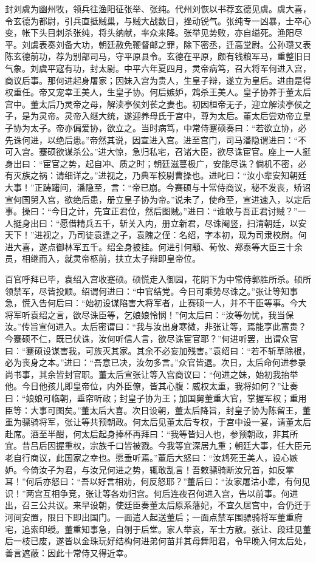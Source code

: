 封刘虞为幽州牧，领兵往渔阳征张举、张纯。代州刘恢以书荐玄德见虞。虞大喜，令玄德为都尉，引兵直抵贼巢，与贼大战数日，挫动锐气。张纯专一凶暴，士卒心变，帐下头目刺杀张纯，将头纳献，率众来降。张举见势败，亦自缢死。渔阳尽平。刘虞表奏刘备大功，朝廷赦免鞭督邮之罪，除下密丞，迁高堂尉。公孙瓒又表陈玄德前功，荐为别部司马，守平原县令。玄德在平原，颇有钱粮军马，重整旧日气象。刘虞平寇有功，封太尉。中平六年夏四月，灵帝病笃，召大将军何进入宫，商议后事。那何进起身屠家；因妹入宫为贵人，生皇子辩，遂立为皇后。进由是得权重任。帝又宠幸王美人，生皇子协。何后嫉妒，鸩杀王美人。皇子协养于董太后宫中。董太后乃灵帝之母，解渎亭侯刘苌之妻也。初因桓帝无子，迎立解渎亭侯之子，是为灵帝。灵帝入继大统，遂迎养母氏于宫中，尊为太后。董太后尝劝帝立皇子协为太子。帝亦偏爱协，欲立之。当时病笃，中常侍蹇硕奏曰：“若欲立协，必先诛何进，以绝后患。”帝然其说，因宣进入宫。进至宫门，司马潘隐谓进曰：“不可入宫。蹇硕欲谋杀公。”进大惊，急归私宅，召诸大臣，欲尽诛宦官。座上一人挺身出曰：“宦官之势，起自冲、质之时；朝廷滋蔓极广，安能尽诛？倘机不密，必有灭族之祸：请细详之。”进视之，乃典军校尉曹操也。进叱曰：“汝小辈安知朝廷大事！”正踌躇间，潘隐至，言：“帝已崩。今赛硕与十常侍商议，秘不发丧，矫诏宣何国舅入宫，欲绝后患，册立皇子协为帝。”说未了，使命至，宣进速入，以定后事。操曰：“今日之计，先宜正君位，然后图贼。”进曰：“谁敢与吾正君讨贼？”一人挺身出曰：“愿借精兵五千，斩关入内，册立新君，尽诛阉竖，扫清朝廷，以安天下！”进视之，乃司徒袁逢之子，袁隗之侄：名绍，字本初，现为司隶校尉。何进大喜，遂点御林军五千。绍全身披挂。何进引何顒、荀攸、郑泰等大臣三十余员，相继而入，就灵帝柩前，扶立太子辩即皇帝位。

百官呼拜已毕，袁绍入宫收蹇硕。硕慌走入御园，花阴下为中常侍郭胜所杀。硕所领禁军，尽皆投顺。绍谓何进曰：“中官结党。今日可乘势尽诛之。”张让等知事急，慌入告何后曰：“始初设谋陷害大将军者，止赛硕一人，并不干臣等事。今大将军听袁绍之言，欲尽诛臣等，乞娘娘怜悯！”何太后曰：“汝等勿忧，我当保汝。”传旨宣何进入。太后密谓曰：“我与汝出身寒微，非张让等，焉能享此富贵？今蹇硕不仁，既已伏诛，汝何听信人言，欲尽诛宦官耶？”何进听罢，出谓众官曰：“蹇硕设谋害我，可族灭其家。其余不必妄加残害。”袁绍曰：“若不斩草除根，必为丧身之本。”进曰：“吾意已决，汝勿多言。”众官皆退。次日，太后命何进参录尚书事，其余皆封官职。董太后宣张让等入宫商议曰：“何进之妹，始初我抬举他。今日他孩儿即皇帝位，内外臣僚，皆其心腹：威权太重，我将如何？”让奏曰：“娘娘可临朝，垂帘听政；封皇子协为王；加国舅董重大官，掌握军权；重用臣等：大事可图矣。”董太后大喜。次日设朝，董太后降旨，封皇子协为陈留王，董重为骠骑将军，张让等共预朝政。何太后见董太后专权，于宫中设一宴，请董太后赴席。酒至半酣，何太后起身捧杯再拜曰：“我等皆妇人也，参预朝政，非其所宜。昔吕后因握重权，宗族千口皆被戮。今我等宜深居九重；朝廷大事，任大臣元老自行商议，此国家之幸也。愿垂听焉。”董后大怒曰：“汝鸩死王美人，设心嫉妒。今倚汝子为君，与汝兄何进之势，辄敢乱言！吾敕骠骑断汝兄首，如反掌耳！”何后亦怒曰：“吾以好言相劝，何反怒耶？”董后曰：“汝家屠沽小辈，有何见识！”两宫互相争竞，张让等各劝归宫。何后连夜召何进入宫，告以前事。何进出，召三公共议。来早设朝，使廷臣奏董太后原系藩妃，不宜久居宫中，合仍迁于河间安置，限日下即出国门。一面遣人起送董后；一面点禁军围骠骑将军董重府宅，追索印绶。董重知事急，自刎于后堂。家人举哀，军士方散。张让、段珪见董后一枝已废，遂皆以金珠玩好结构何进弟何苗并其母舞阳君，令早晚入何太后处，善言遮蔽：因此十常侍又得近幸。

